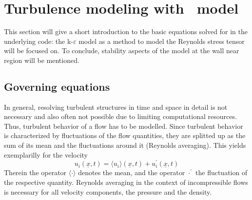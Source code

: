 

\chapter{Turbulence modeling with \ke\, model} %
\label{cha:turbulence_modeling_with_k_epsilon_model}

This section will give a short introduction to the basic equations solved for in the underlying code: the k-$\varepsilon$ model as a method to model the Reynolds stress tensor will be focused on. To conclude, stability aspects of the model at the wall near region will be mentioned.  

\section{Governing equations} %
\label{sec:governing_equations}

In general, resolving turbulent structures in time and space in detail is not necessary and also often not possible due to limiting computational resources.
Thus, turbulent behavior of a flow has to be modelled.
Since turbulent behavior is characterized by fluctuations of the flow quantities, they are splitted up as the sum of its mean and the fluctuations around it (Reynolds averaging). This yields exemplarilly for the velocity
\begin{equation}
	u_i(\underline{x},t) = \langle u_i \rangle (\underline{x},t) + u^{\prime}_i(\underline{x},t)
\end{equation}
Therein the operator $\langle \cdot \rangle$ denotes the mean, and the operator $\cdot^{\prime}$ the fluctuation of the respective quantity. Reynolds averaging in the context of incompressible flows is necessary for all velocity components, the pressure and the density.

